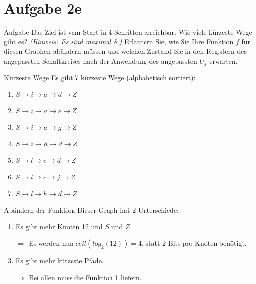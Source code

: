 \documentclass[fleqn,compress,utf8,aspectratio=169,t]{beamer}
\begin{document}
\section{Aufgabe 2e}

\begin{frame}{Aufgabe}
Das Ziel ist vom Start in 4 Schritten erreichbar. Wie viele kürzeste Wege gibt es? \textit{(Hinweis: Es sind maximal 8.)} Erläutern Sie, wie Sie Ihre Funktion $f$ für diesen Graphen abändern müssen und welchen Zustand Sie in den Registern des angepassten Schaltkreises nach der Anwendung des angepassten $U_f$ erwarten.
\end{frame}

\begin{frame}{Kürzeste Wege}
Es gibt 7 kürzeste Wege (alphabetisch sortiert):
\begin{enumerate}
	\item $S \rightarrow i \rightarrow a \rightarrow d \rightarrow Z$
	\item $S \rightarrow i \rightarrow a \rightarrow e \rightarrow Z$
	\item $S \rightarrow i \rightarrow a \rightarrow g \rightarrow Z$
	\item $S \rightarrow i \rightarrow h \rightarrow d \rightarrow Z$
	\item $S \rightarrow l \rightarrow c \rightarrow d \rightarrow Z$
	\item $S \rightarrow l \rightarrow c \rightarrow j \rightarrow Z$
	\item $S \rightarrow l \rightarrow h \rightarrow d \rightarrow Z$
\end{enumerate}
\end{frame}

\begin{frame}{Abändern der Funktion}
Dieser Graph hat 2 Unterschiede:
\begin{enumerate}
	\item Es gibt mehr Knoten 12 und $S$ und $Z$.
	\item[$\Rightarrow$] Es werden nun $ceil(log_2(12)) = 4$, statt 2 Bits pro Knoten benötigt.
	\item Es gibt mehr kürzeste Pfade.
	\item[$\Rightarrow$] Bei allen muss die Funktion 1 liefern.
\end{enumerate}
\end{frame}
\end{document}
